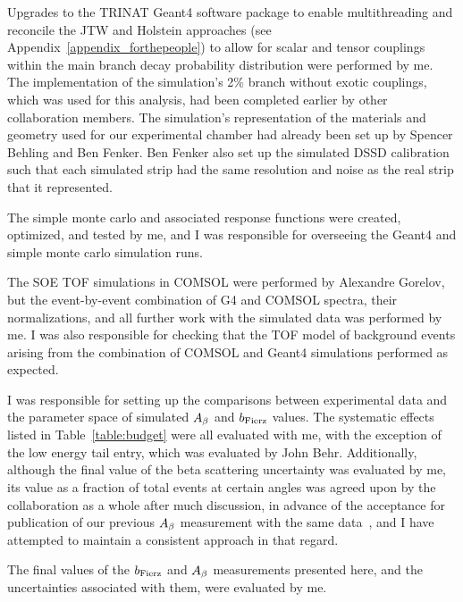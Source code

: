 Upgrades to the TRINAT Geant4 software package to enable multithreading and reconcile the \acs{JTW} and Holstein approaches (see Appendix~\ref{appendix_forthepeople}) to allow for scalar and tensor couplings within the main branch decay probability distribution were performed by me.  The implementation of the simulation's 2\% branch without exotic couplings, which was used for this analysis, had been completed earlier by other collaboration members.
The simulation's representation of the materials and geometry used for our experimental chamber had already been set up by Spencer Behling and Ben Fenker.  Ben Fenker also set up the simulated DSSD calibration such that each simulated strip had the same resolution and noise as the real strip that it represented.  

The simple monte carlo and associated response functions were created, optimized, and tested by me, and I was responsible for overseeing the Geant4 and simple monte carlo simulation runs.  


The \ac{SOE} \ac{TOF} simulations in COMSOL were performed by Alexandre Gorelov, but the event-by-event combination of G4 and COMSOL spectra, their normalizations, and all further work with the simulated data was performed by me.  I was also responsible for checking that the TOF model of background events arising from the combination of COMSOL and Geant4 simulations performed as expected.  

I was responsible for setting up the comparisons between experimental data and the parameter space of simulated $A_{\beta}$ and $b_{\mathrm{Fierz}}$ values.  The systematic effects listed in Table~\ref{table:budget} were all evaluated with me, with the exception of the low energy tail entry, which was evaluated by John Behr.  Additionally, although the final value of the beta scattering uncertainty was evaluated by me, its value as a fraction of total events at certain angles was agreed upon by the collaboration as a whole after much discussion, in advance of the acceptance for publication of our previous $A_{\beta}$ measurement with the same data~\cite{ben_Abeta}, and I have attempted to maintain a consistent approach in that regard.  

The final values of the $b_{\mathrm{Fierz}}$ and $A_{\beta}$ measurements presented here, and the uncertainties associated with them, were evaluated by me.  

